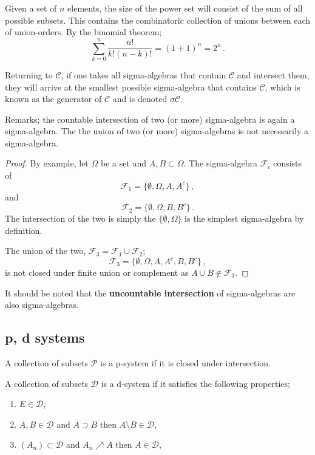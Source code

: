 Given a set of $n$ elements, the size of the power set will consist of the sum of all possible subsets. This contains the combinatoric collection of unions between each of union-orders. By the binomial theorem;
\begin{equation}
	\sum_{k=0}^n \frac{n!}{k!(n-k)!} = (1+1)^n = 2^n\,.
\end{equation}

Returning to $\mathcal{C}$, if one takes all sigma-algebras that contain $\mathcal{C}$ and intersect them, they will arrive at the smallest possible sigma-algebra that contains $\mathcal{C}$, which is known as the generator of $\mathcal{C}$ and is denoted $\sigma\mathcal{C}$.

Remarks; the countable intersection of two (or more) sigma-algebra is again a sigma-algebra. The the union of two (or more) sigma-algebras is not necessarily a sigma-algebra.
\begin{proof}
	By example, let $\Omega$ be a set and $A,B \subset \Omega$. The sigma-algebra $\mathcal{F}_i$ consists of 
	\begin{equation}
		\mathcal{F}_1 = \{\emptyset, \Omega, A, A^c\}\,,
	\end{equation}
	and
	\begin{equation}
		\mathcal{F}_2 = \{\emptyset, \Omega, B, B^c\}\,.
	\end{equation}
	The intersection of the two is simply the $\{\emptyset, \Omega\}$ is the simplest sigma-algebra by definition. 

	The union of the two, $\mathcal{F}_3 = \mathcal{F}_1 \cup \mathcal{F}_2$;
	\begin{equation}
		\mathcal{F}_3 = \{\emptyset, \Omega, A, A^c, B, B^c\}\,,
	\end{equation}
	is not closed under finite union or complement as $A \cup B \notin \mathcal{F}_3$. 
\end{proof}
It should be noted that the \textbf{uncountable intersection} of sigma-algebras are also sigma-algebras.


\subsection{p, d systems}

A collection of subsets $\mathcal{P}$ is a p-system if it is closed under intersection. 

A collection of subsets $\mathcal{D}$ is a d-system if it satisfies the following properties;
\begin{enumerate}
	\item $E\in \mathcal{D}$,
	\item $A, B \in \mathcal{D}$ and $A\supset B$ then $A\setminus B \in \mathcal{D}$,
	\item $(A_n) \subset \mathcal{D}$ and $A_n \nearrow A$ then $A\in \mathcal{D}$,
\end{enumerate}


